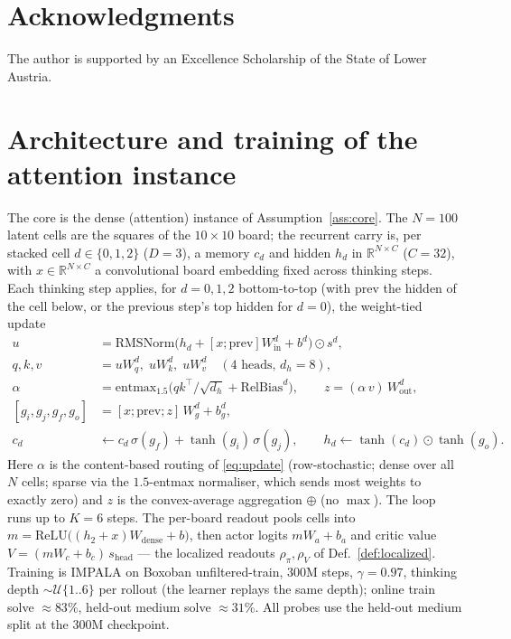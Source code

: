 \documentclass{article} %
\theoremstyle{plain}
\theoremstyle{definition}
\newenvironment{ack}{\section*{Acknowledgments}}{}
\begin{document}
\begin{ack}
The author is supported by an Excellence Scholarship of the State of Lower Austria.
\end{ack}




\newpage
\appendix
\onecolumn

\section{Architecture and training of the attention instance}
\label{app:arch}

The core is the dense (attention) instance of Assumption~\ref{ass:core}. The
$N=100$ latent cells are the squares of the $10\times10$ board; the recurrent
carry is, per stacked cell $d\in\{0,1,2\}$ ($D=3$), a memory $c_d$ and hidden
$h_d$ in $\mathbb{R}^{N\times C}$ ($C=32$), with $x\in\mathbb{R}^{N\times C}$ a
convolutional board embedding fixed across thinking steps. Each thinking step
applies, for $d=0,1,2$ bottom-to-top (with $\mathrm{prev}$ the hidden of the cell
below, or the previous step's top hidden for $d{=}0$), the weight-tied update
\begin{align*}
  u &= \mathrm{RMSNorm}\!\bigl(h_d + [x;\mathrm{prev}]W_{\mathrm{in}}^{d} + b^{d}\bigr)\odot s^{d},\\
  q,k,v &= uW_q^{d},\; uW_k^{d},\; uW_v^{d}\quad(\text{$4$ heads, }d_h{=}8),\\
  \alpha &= \mathrm{entmax}_{1.5}\!\bigl(qk^{\top}/\sqrt{d_h}+\mathrm{RelBias}^{d}\bigr),\qquad
  z=(\alpha\,v)\,W_{\mathrm{out}}^{d},\\
  [g_i,g_j,g_f,g_o] &= [x;\mathrm{prev};z]\,W_g^{d}+b_g^{d},\\
  c_d &\leftarrow c_d\,\sigma(g_f)+\tanh(g_i)\,\sigma(g_j),\qquad
  h_d \leftarrow \tanh(c_d)\odot\tanh(g_o).
\end{align*}
Here $\alpha$ is the content-based routing of \eqref{eq:update} (row-stochastic;
dense over all $N$ cells; sparse via the $1.5$-entmax normaliser, which sends most
weights to exactly zero) and $z$ is the convex-average aggregation $\oplus$ (no
$\max$). The loop runs up to $K=6$ steps. The per-board readout pools cells into
$m=\mathrm{ReLU}\bigl((h_2+x)W_{\mathrm{dense}}+b\bigr)$, then actor logits
$mW_a+b_a$ and critic value $V=(mW_c+b_c)\,s_{\mathrm{head}}$ --- the localized
readouts $\rho_\pi,\rho_V$ of Def.~\ref{def:localized}. Training is IMPALA on
Boxoban unfiltered-train, $300\mathrm{M}$ steps, $\gamma=0.97$, thinking depth
$\sim\mathcal U\{1..6\}$ per rollout (the learner replays the same depth); online
train solve $\approx83\%$, held-out medium solve $\approx31\%$. All probes use the
held-out medium split at the $300\mathrm{M}$ checkpoint.
\end{document}
